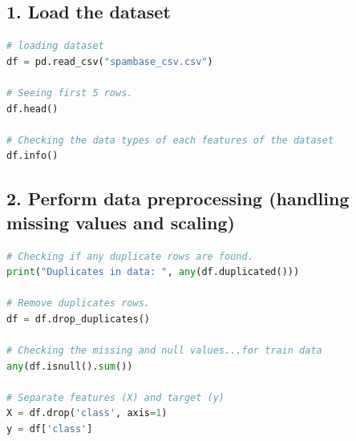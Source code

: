 \documentclass[11pt]{article}
\begin{document}
\subsection*{1. Load the dataset}
\begin{lstlisting}[language=Python]
# loading dataset
df = pd.read_csv("spambase_csv.csv")

# Seeing first 5 rows.
df.head()

# Checking the data types of each features of the dataset
df.info()
\end{lstlisting}

\subsection*{2. Perform data preprocessing (handling missing values and scaling)}
\begin{lstlisting}[language=Python]
# Checking if any duplicate rows are found.
print("Duplicates in data: ", any(df.duplicated()))

# Remove duplicates rows.
df = df.drop_duplicates()

# Checking the missing and null values...for train data
any(df.isnull().sum())

# Separate features (X) and target (y)
X = df.drop('class', axis=1)
y = df['class']
\end{lstlisting}
\end{document}
